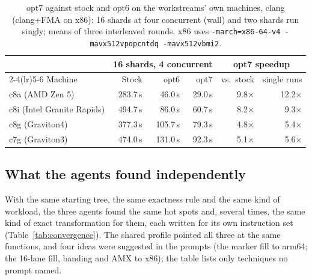 \documentclass[11pt]{article}
\newcommand{\code}[1]{\texttt{#1}}
\begin{document}
\begin{table}[h]
\centering
\caption{opt7 against stock and opt6 on the workstreams' own machines, clang (clang+FMA on x86):
16 shards at four concurrent (wall) and two shards run singly; means of three interleaved
rounds. x86 uses \code{-march=x86-64-v4 -mavx512vpopcntdq -mavx512vbmi2}.}
\label{tab:opt7}
\begin{tabular}{lrrrrr}
\toprule
& \multicolumn{3}{c}{16 shards, 4 concurrent} & \multicolumn{2}{c}{opt7 speedup} \\
\cmidrule(lr){2-4}\cmidrule(lr){5-6}
Machine & Stock & opt6 & opt7 & vs.\ stock & single runs \\
\midrule
c8a (AMD Zen 5) & 283.7\,s & 46.0\,s & 29.0\,s & 9.8$\times$ & 12.2$\times$ \\
c8i (Intel Granite Rapids) & 494.7\,s & 86.0\,s & 60.7\,s & 8.2$\times$ & 9.3$\times$ \\
c8g (Graviton4) & 377.3\,s & 105.7\,s & 79.3\,s & 4.8$\times$ & 5.4$\times$ \\
c7g (Graviton3) & 474.0\,s & 131.0\,s & 92.3\,s & 5.1$\times$ & 5.6$\times$ \\
\bottomrule
\end{tabular}
\end{table}

\subsection{What the agents found independently}
\label{sec:convergence}

With the same starting tree, the same exactness rule and the same kind of workload, the three
agents found the same hot spots and, several times, the same kind of exact transformation for
them, each written for its own instruction set (Table~\ref{tab:convergence}). The shared
profile pointed all three at the same functions, and four ideas were suggested in the prompts
(the marker fill to arm64; the 16-lane fill, banding and AMX to x86); the table lists only
techniques no prompt named.
\end{document}
